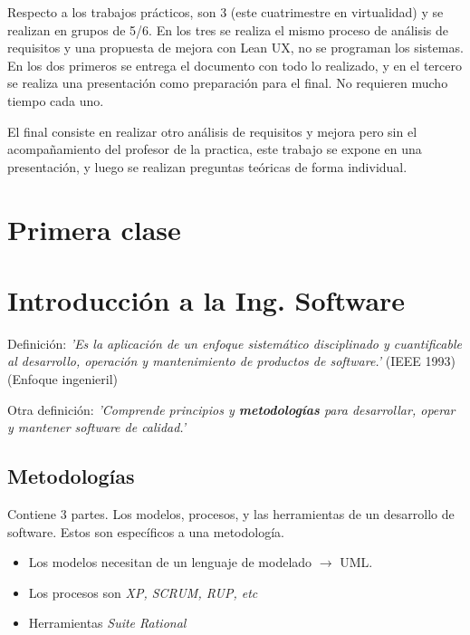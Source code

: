 \documentclass[titlepage,a4paper]{article}
\begin{document}
Respecto a los trabajos prácticos, son 3 (este cuatrimestre en virtualidad) y se realizan en grupos de 5/6. En los tres se realiza el mismo proceso de análisis de requisitos y una propuesta de mejora con Lean UX, no se programan los sistemas. En los dos primeros se entrega el documento con todo lo realizado, y en el tercero se realiza una presentación como preparación para el final. No requieren mucho tiempo cada uno. 

El final consiste en realizar otro análisis de requisitos y mejora pero sin el acompañamiento del profesor de la practica, este trabajo se expone en una presentación, y luego se realizan preguntas teóricas de forma individual.


\newpage

\section*{Primera clase}
\section{Introducción a la Ing. Software}
Definición: \textit{'Es la aplicación de un enfoque sistemático disciplinado y cuantificable al desarrollo, operación y mantenimiento de productos de software.'} (IEEE 1993) (Enfoque ingenieril)

\medskip

Otra definición: \textit{'Comprende principios y \textbf{metodologías} para desarrollar, operar y mantener software de calidad.'}


\subsection{Metodologías}
Contiene 3 partes. Los modelos, procesos, y las herramientas de un desarrollo de software. Estos son específicos a una metodología.

    \begin{itemize}
        \item Los modelos necesitan de un lenguaje de modelado $\rightarrow$ UML.
        \item Los procesos son \textit{XP, SCRUM, RUP, etc}
        \item Herramientas \textit{Suite Rational}
    \end{itemize}
    
\end{document}
